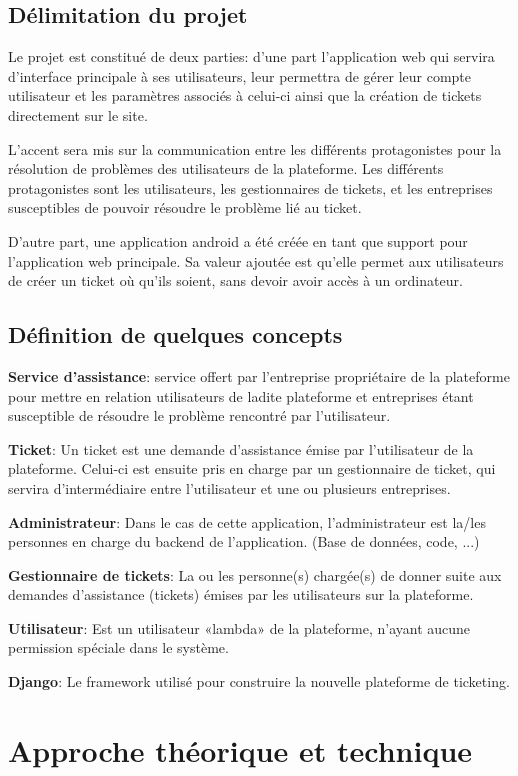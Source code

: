 \documentclass[12pt,table,a4paper]{report}
\begin{document}
\section{Délimitation du projet}
Le projet est constitué de deux parties: d'une part l'application web qui servira d'interface principale à ses utilisateurs, leur permettra de gérer leur compte utilisateur et les paramètres associés à celui-ci ainsi que la création de tickets directement sur le site.

L'accent sera mis sur la communication entre les différents protagonistes pour la résolution de problèmes des utilisateurs de la plateforme. Les différents protagonistes sont les utilisateurs, les gestionnaires de tickets, et les entreprises susceptibles de pouvoir résoudre le problème lié au ticket.

D'autre part, une application android a été créée en tant que support pour l'application web principale. Sa valeur ajoutée est qu'elle permet aux utilisateurs de créer un ticket où qu'ils soient, sans devoir avoir accès à un ordinateur.

\section{Définition de quelques concepts}
\textbf{Service d'assistance}: service offert par l'entreprise propriétaire de la plateforme pour mettre en relation utilisateurs de ladite plateforme et entreprises étant susceptible de résoudre le problème rencontré par l'utilisateur.

\textbf{Ticket}: Un ticket est une demande d'assistance émise par l'utilisateur de la plateforme. Celui-ci est ensuite pris en charge par un gestionnaire de ticket, qui servira d'intermédiaire entre l'utilisateur et une ou plusieurs entreprises.

\textbf{Administrateur}: Dans le cas de cette application, l'administrateur est la/les personnes en charge du backend de l'application. (Base de données, code, ...)

\textbf{Gestionnaire de tickets}: La ou les personne(s) chargée(s) de donner suite aux demandes d'assistance (tickets) émises par les utilisateurs sur la plateforme.

\textbf{Utilisateur}: Est un utilisateur «lambda» de la plateforme, n'ayant aucune permission spéciale dans le système.

\textbf{Django}: Le framework utilisé pour construire la nouvelle plateforme de ticketing.


\chapter{Approche théorique et technique}
\end{document}
